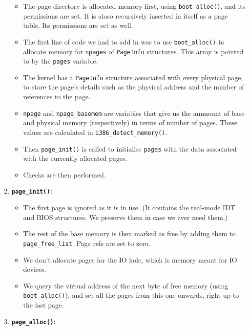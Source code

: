 \documentclass[]{article}
\begin{document}
\begin{enumerate}
  \begin{itemize}
  \itemsep1pt\parskip0pt
  \item
    The page directory is allocated memory first, using
    \texttt{boot\_alloc()}, and its permissions are set. It is aloso
    recursively inserted in itself as a page table. Its permissions are
    set as well.
  \item
    The first line of code we had to add in was to use
    \texttt{boot\_alloc()} to allocate memory for \texttt{npages} of
    \texttt{PageInfo} structures. This array is pointed to by the
    \texttt{pages} variable.
  \item
    The kernel has a \texttt{PageInfo} structure associated with every
    physical page, to store the page's details such as the physical
    address and the number of references to the page.
  \item
    \texttt{npage} and \texttt{npage\_basemem} are variables that give
    us the ammount of base and physical memory (respectively) in terms
    of number of pages. These values are calculated in
    \texttt{i386\_detect\_memory()}.
  \item
    Then \texttt{page\_init()} is called to initialise \texttt{pages}
    with the data associated with the currently allocated pages.
  \item
    Checks are then performed.
  \end{itemize}
\item
  \textbf{\texttt{page\_init()}:}

  \begin{itemize}
  \itemsep1pt\parskip0pt
  \item
    The first page is ignored as it is in use. (It contains the
    real-mode IDT and BIOS structures. We preserve them in case we ever
    need them.)
  \item
    The rest of the base memory is then marked as free by adding them to
    \texttt{page\_free\_list}. Page refs are set to zero.
  \item
    We don't allocate pages for the IO hole, which is memory meant for
    IO devices.
  \item
    We query the virtual address of the next byte of free memory (using
    \texttt{boot\_alloc()}), and set all the pages from this one
    onwards, right up to the last page.
  \end{itemize}
\item
  \textbf{\texttt{page\_alloc()}:}


\end{enumerate}
\end{document}
